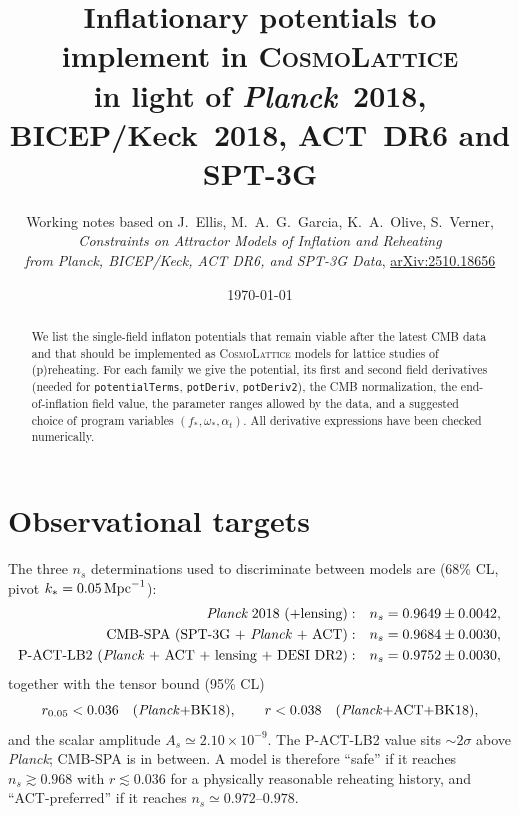 \documentclass[11pt,a4paper]{article}
\title{Inflationary potentials to implement in \textsc{CosmoLattice}\\[2pt]
\large in light of \textit{Planck}~2018, BICEP/Keck~2018, ACT~DR6 and SPT-3G}
\author{Working notes based on J.~Ellis, M.~A.~G.~Garcia, K.~A.~Olive, S.~Verner,\\
\textit{Constraints on Attractor Models of Inflation and Reheating}\\
\textit{from Planck, BICEP/Keck, ACT DR6, and SPT-3G Data},
\href{https://arxiv.org/abs/2510.18656}{arXiv:2510.18656}}
\date{\today}
\newcommand{\at}{\alpha_t}
\begin{document}
\maketitle

\begin{abstract}
We list the single-field inflaton potentials that remain viable after the latest CMB data and that should be implemented as \textsc{CosmoLattice} models for lattice studies of (p)reheating. For each family we give the potential, its first and second field derivatives (needed for \texttt{potentialTerms}, \texttt{potDeriv}, \texttt{potDeriv2}), the CMB normalization, the end-of-inflation field value, the parameter ranges allowed by the data, and a suggested choice of program variables $(f_*,\omega_*,\at)$. All derivative expressions have been checked numerically.
\end{abstract}

\tableofcontents

\section{Observational targets}
\label{sec:data}

The three $n_s$ determinations used to discriminate between models are (68\% CL, pivot $k_*=0.05\,{\rm Mpc}^{-1}$):
\begin{align}
\textit{Planck}~2018\ (+\text{lensing}): &\quad n_s = 0.9649\pm 0.0042, \label{eq:nsPlanck}\\
\text{CMB-SPA (SPT-3G + \textit{Planck} + ACT)}: &\quad n_s = 0.9684\pm 0.0030, \label{eq:nsSPA}\\
\text{P-ACT-LB2 (\textit{Planck} + ACT + lensing + DESI DR2)}: &\quad n_s = 0.9752\pm 0.0030, \label{eq:nsACT}
\end{align}
together with the tensor bound (95\% CL)
\begin{equation}
r_{0.05} < 0.036 \quad (\text{\textit{Planck}+BK18}), \qquad r < 0.038 \quad (\text{\textit{Planck}+ACT+BK18}),
\end{equation}
and the scalar amplitude $A_s \simeq 2.10\times 10^{-9}$. The P-ACT-LB2 value sits $\sim 2\sigma$ above \textit{Planck}; CMB-SPA is in between. A model is therefore ``safe'' if it reaches $n_s\gtrsim 0.968$ with $r\lesssim 0.036$ for a physically reasonable reheating history, and ``ACT-preferred'' if it reaches $n_s\simeq 0.972$--$0.978$.
\end{document}
